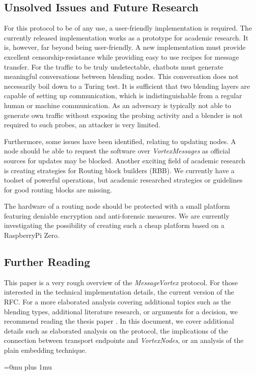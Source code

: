 \documentclass[acmsmall, screen, final, natbib=false]{acmart}
\begin{document}
	\subsection{Unsolved Issues and Future Research}
	For this protocol to be of any use, a user-friendly implementation is required. The currently released implementation works as a prototype for academic research. It is, however, far beyond being user-friendly. A new implementation must provide excellent censorship-resistance while providing easy to use recipes for message transfer.  For the traffic to be truly undetectable, chatbots must generate meaningful conversations between blending nodes. This conversation does not necessarily boil down to a Turing test. It is sufficient that two blending layers are capable of setting up communication, which is indistinguishable from a regular human or machine communication. As an adversary is typically not able to generate own traffic without exposing the probing activity and a blender is not required to such probes, an attacker is very limited. 
	
	Furthermore, some issues have been identified, relating to updating nodes. A node should be able to request the software over \emph{VortexMessages} as official sources for updates may be blocked. Another exciting field of academic research is creating strategies for Routing block builders (RBB). We currently have a toolset of powerful operations, but academic researched strategies or guidelines for good routing blocks are missing. 
	
	The hardware of a routing node should be protected with a small platform featuring deniable encryption and anti-forensic measures. We are currently investigating the possibility of creating such a cheap platform based on a RaspberryPi Zero. 
	
	\subsection{Further Reading}
	This paper is a very rough overview of the \emph{MessageVortex} protocol. For those interested in the technical implementation details, the current version of the RFC\cite{MessageVortexRFC}. For a more elaborated analysis covering additional topics such as the blending types, additional literature research, or arguments for a decision, we recommend reading the thesis paper \cite{messageVortex}. In this document, we cover additional details such as elaborated analysis on the protocol, the implications of the connection between transport endpoints and \emph{VortexNodes}, or an analysis of the plain embedding technique.
	
	
	\Urlmuskip=0mu plus 1mu %
	
	\printbibliography
	
\end{document}
